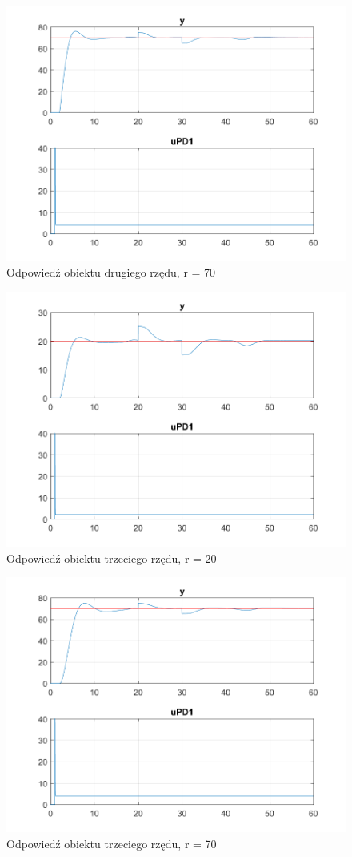 \begin{figure}[]
	\centering
	\includegraphics[scale = 0.7]{fig/Z1_New_Signal_1/fig1_2_70.png}
	\caption		
	{Odpowiedź obiektu drugiego rzędu, r = 70}
	\label{wykres_2}
\end{figure} 

\begin{figure}[]
	\centering
	\includegraphics[scale = 0.7]{fig/Z1_New_Signal_1/fig1_3_20.png}
	\caption		
	{Odpowiedź obiektu trzeciego rzędu, r = 20}
	\label{wykres_3}
\end{figure} 

\begin{figure}[]
	\centering
	\includegraphics[scale = 0.7]{fig/Z1_New_Signal_1/fig1_3_70.png}
	\caption		
	{Odpowiedź obiektu trzeciego rzędu, r = 70}
	\label{wykres_4}
\end{figure} 